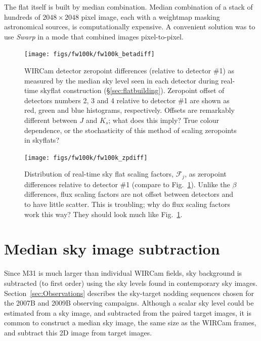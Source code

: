 \documentclass[iop]{emulateapj}
\newcommand{\sw}[1]{\textit{#1}} %
\newcommand{\todo}[1]{\textcolor{RedOrange}{#1}} %
\newcommand{\Fig}[1]{Fig.~\ref{fig:#1}}  %
\newcommand{\Sec}[1]{\S\ref{sec:#1}}  %
\begin{document}
The flat itself is built by median combination. Median combination of a stack of hundreds of $2048\times2048$ pixel image, each with a weightmap masking astronomical sources, is computationally expensive. A convenient solution was to use \sw{Swarp} \citep[an image-mosaicing software package,][]{Bertin:2002} in a mode that combined images pixel-to-pixel.

\begin{figure}[t]
\centering
\texttt{[image: figs/fw100k/fw100k\_betadiff]}
\caption{WIRCam detector zeropoint differences (relative to detector \#1) as measured by the median sky level seen in each detector during real-time skyflat construction (\Sec{flatbuilding}).
Zeropoint offset of detectors numbers 2, 3 and 4 relative to detector \#1 are shown as red, green and blue histograms, respectively.
\todo{Offsets are remarkably different between $J$ and $K_s$; what does this imply? True colour dependence, or the stochasticity of this method of scaling zeropoints in skyflats?}}
\label{fig:fw100k_betadiff}
\end{figure}


\begin{figure}[t]
\centering
\texttt{[image: figs/fw100k/fw100k\_zpdiff]}
\caption{Distribution of real-time sky flat scaling factors, $\mathcal{F}_j$, as zeropoint differences relative to detector \#1 (compare to \Fig{fw100k_betadiff}).
Unlike the $\beta$ differences, flux scaling factors are not offset between detectors and to have little scatter.
\todo{This is troubling; why do flux scaling factors work this way? They should look much like \Fig{fw100k_betadiff}.}}
\label{fig:fw100k_zpdiff}
\end{figure}

\section{Median sky image subtraction}
\label{sec:mediansky}

Since M31 is much larger than individual WIRCam fields, sky background is subtracted (to first order) using the sky levels found in contemporary sky images.
Section~\ref{sec:Observations} describes the sky-target nodding sequences chosen for the 2007B and 2009B observing campaigns. 
Although a scalar sky level could be estimated from a sky image, and subtracted from the paired target images, it is common to construct a median sky image, the same size as the WIRCam frames, and subtract this 2D image from target images.
\end{document}
